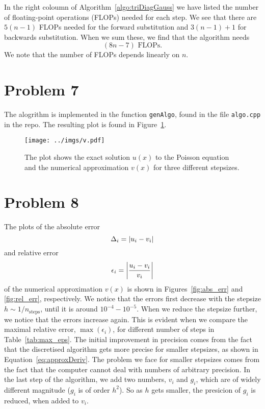 \documentclass[english,notitlepage,aps,pra,10pt]{revtex4-2}
\begin{document}
In the right coloumn of Algorithm~\ref{algo:triDiagGauss} we have listed the number of floating-point operations (FLOPs) needed for each step. We see that there are $5(n-1)$ FLOPs needed for the forward substitution and $3(n-1)+1$ for backwards substitution. When we sum these, we find that the algorithm needs
\begin{equation}
    (8n-7) \textrm{ FLOPs}.
    \label{eq:genFlop}
\end{equation} 
We note that the number of FLOPs depends linearly on $n$.


\section*{Problem 7}

The alogrithm is implemented in the function \verb+genAlgo+, found in the file \verb+algo.cpp+ in the repo. The resulting plot is found in Figure~\ref{fig:v}.

\begin{figure}%
    \begin{center}
        \texttt{[image: ../imgs/v.pdf]}
        \caption{The plot shows the exact solution $u(x)$ to the Poisson equation and the numerical approximation $v(x)$ for three different stepsizes.}
        \label{fig:v}
    \end{center}
\end{figure}


\section*{Problem 8}

The plots of the absolute error 
\begin{equation}
    \Delta_i = \abs{u_i - v_i}
\end{equation}
and relative error 
\begin{equation}
    \epsilon_i = \abs{\frac{u_i - v_i}{v_i}}
\end{equation}
of the numerical approximation $v(x)$ is shown in Figures~\ref{fig:abs_err} and \ref{fig:rel_err}, respectively. We notice that the errors first decrease with the stepsize $h\sim 1/n_\mathrm{steps}$, until it is around $10^{-4}-10^{-5}$. When we reduce the stepsize further, we notice that the errors increase again. This is evident when we compare the maximal relative error, $\max(\epsilon_i)$, for different number of steps in Table~\ref{tab:max_eps}. The initial improvement in precision comes from the fact that the discretised algorithm gets more precise for smaller stepsizes, as shown in Equation~\ref{eq:approxDeriv}. The problem we face for smaller stepsizes comes from the fact that the computer cannot deal with numbers of arbitrary precision. In the last step of the algorithm, we add two numbers, $v_i$ and $g_i$, which are of widely different magnitude ($g_i$ is of order $h^2$). So as $h$ gets smaller, the presicion of $g_i$ is reduced, when added to $v_i$.
\end{document}
